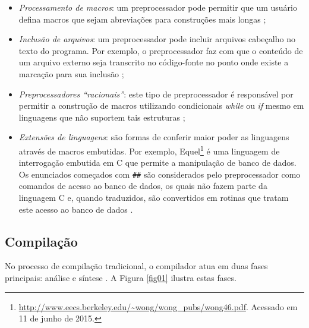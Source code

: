 \begin{itemize}

\item \textit{Processamento de macros}: um preprocessador pode permitir que um usuário 
    defina macros que sejam abreviações para construções mais longas \cite[pág. 8]{ref3};

\item \textit{Inclusão de arquivos}: um preprocessador pode incluir arquivos cabeçalho no
     texto do programa. Por exemplo, o preprocessador faz com que o conteúdo de
     um arquivo externo seja transcrito no código-fonte no ponto onde existe a 
    marcação para sua inclusão \cite[pág. 8]{ref2};

\item \textit{Preprocessadores “racionais”}: este tipo de preprocessador é responsável 
    por permitir a construção de macros utilizando condicionais \textit{while} ou \textit{if} mesmo
     em linguagens que não suportem tais estruturas \cite[pág. 8]{ref2};

\item \textit{Extensões de linguagens}: são formas de conferir maior poder as linguagens
     através de macros embutidas. Por exemplo, 
    Equel\footnote{\url{http://www.eecs.berkeley.edu/~wong/wong\_pubs/wong46.pdf}. Acessado em 11 de junho de 2015.} é uma linguagem de 
    interrogação embutida em C que permite a manipulação de banco de dados. 
    Os enunciados começados com \texttt{\#\#} são considerados pelo preprocessador como
     comandos de acesso ao banco de dados, os quais não fazem parte da 
    linguagem C e, quando traduzidos, são convertidos em rotinas que tratam 
    este acesso ao banco de dados \cite[pág. 8]{ref3}.

\end{itemize}

\subsection{Compilação}

No processo de compilação tradicional, o compilador atua em duas fases 
principais: análise e síntese \cite[pág. 26]{ref6}. A Figura \ref{fig01}
 ilustra estas fases. 

